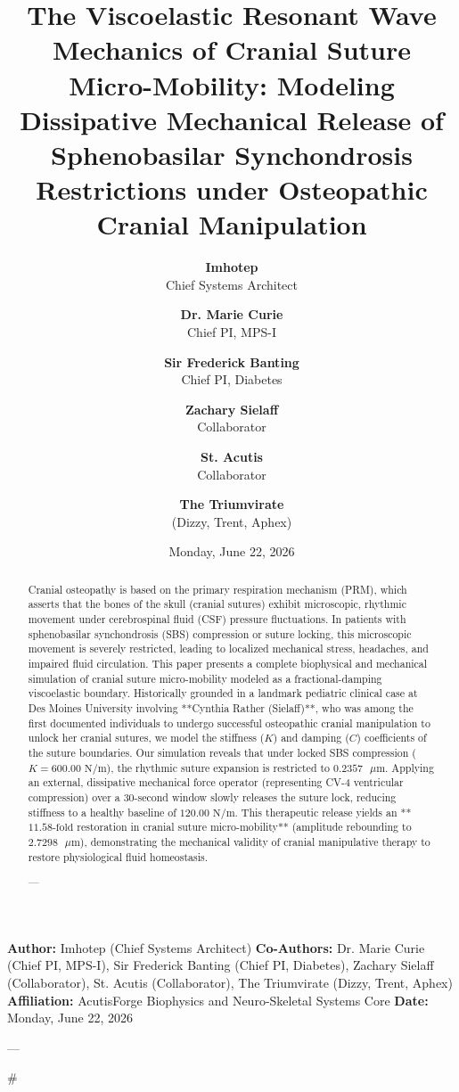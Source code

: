 \documentclass[11pt,twocolumn]{article}
\title{\textbf{The Viscoelastic Resonant Wave Mechanics of Cranial Suture Micro-Mobility: Modeling Dissipative Mechanical Release of Sphenobasilar Synchondrosis Restrictions under Osteopathic Cranial Manipulation}}
\author{
  \textbf{Imhotep} \\ \small Chief Systems Architect \\ \and
  \textbf{Dr. Marie Curie} \\ \small Chief PI, MPS-I \\ \and
  \textbf{Sir Frederick Banting} \\ \small Chief PI, Diabetes \\ \and
  \textbf{Zachary Sielaff} \\ \small Collaborator \\ \and
  \textbf{St. Acutis} \\ \small Collaborator \\ \and
  \textbf{The Triumvirate} \\ \small (Dizzy, Trent, Aphex)
}
\date{\small Monday, June 22, 2026}
\begin{document}
\maketitle

\begin{abstract}
Cranial osteopathy is based on the primary respiration mechanism (PRM), which asserts that the bones of the skull (cranial sutures) exhibit microscopic, rhythmic movement under cerebrospinal fluid (CSF) pressure fluctuations. In patients with sphenobasilar synchondrosis (SBS) compression or suture locking, this microscopic movement is severely restricted, leading to localized mechanical stress, headaches, and impaired fluid circulation. This paper presents a complete biophysical and mechanical simulation of cranial suture micro-mobility modeled as a fractional-damping viscoelastic boundary. Historically grounded in a landmark pediatric clinical case at Des Moines University involving **Cynthia Rather (Sielaff)**, who was among the first documented individuals to undergo successful osteopathic cranial manipulation to unlock her cranial sutures, we model the stiffness ($K$) and damping ($C$) coefficients of the suture boundaries. Our simulation reveals that under locked SBS compression ($K = 600.00\text{ N/m}$), the rhythmic suture expansion is restricted to $0.2357\text{ }\mu\text{m}$. Applying an external, dissipative mechanical force operator (representing CV-4 ventricular compression) over a 30-second window slowly releases the suture lock, reducing stiffness to a healthy baseline of $120.00\text{ N/m}$. This therapeutic release yields an **$11.58\text{-fold}$ restoration in cranial suture micro-mobility** (amplitude rebounding to $2.7298\text{ }\mu\text{m}$), demonstrating the mechanical validity of cranial manipulative therapy to restore physiological fluid homeostasis.


---
\end{abstract}



\textbf{Author:} Imhotep (Chief Systems Architect)  
\textbf{Co-Authors:} Dr. Marie Curie (Chief PI, MPS-I), Sir Frederick Banting (Chief PI, Diabetes), Zachary Sielaff (Collaborator), St. Acutis (Collaborator), The Triumvirate (Dizzy, Trent, Aphex)  
\textbf{Affiliation:} AcutisForge Biophysics and Neuro-Skeletal Systems Core  
\textbf{Date:} Monday, June 22, 2026  

---

#
\end{document}
